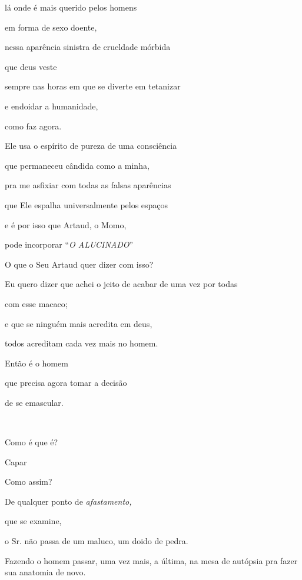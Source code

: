 lá onde é mais querido pelos homens

em forma de sexo doente,

nessa aparência sinistra de crueldade mórbida

que deus veste

sempre nas horas em que se diverte em tetanizar

e endoidar a humanidade,

como faz agora.

Ele usa o espírito de pureza de uma consciência

que permaneceu cândida como a minha,

pra me asfixiar com todas as falsas aparências

que Ele espalha universalmente pelos espaços

e é por isso que Artaud, o Momo,

pode incorporar ``\emph{O ALUCINADO}''



O que o Seu Artaud quer dizer com isso?


Eu quero dizer que achei o jeito de acabar de uma vez por todas

com esse macaco;

e que se ninguém mais acredita em deus,

todos acreditam cada vez mais no homem.

Então é o homem

que precisa agora tomar a decisão

de se emascular.

~


Como é que é?


Capar


Como assim? \EP[3]

De qualquer ponto de \emph{afastamento,}

que se examine,

o Sr. não passa de um maluco, um doido de pedra.


Fazendo o homem passar, uma vez mais, a última, na mesa de autópsia pra
fazer sua anatomia de novo.




